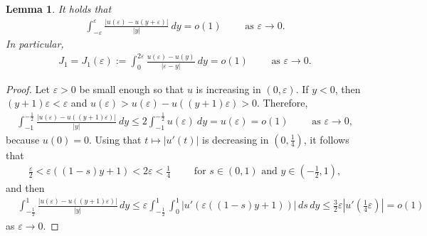 \documentclass[11pt]{article}
\newcommand{\eps}{{\varepsilon}}
\numberwithin{equation}{section}
\newtheorem{lemma}[theorem]{Lemma}
\begin{document}
\begin{lemma}\label{J1:s}
It holds that
\begin{align*}
    \int_{-\eps}^{\eps} \frac{|u(\eps)-u(y+\eps)|}{|y|}\ dy=o(1)\qquad \text{ as }\eps\to 0.
\end{align*}
In particular,
\begin{align*}
J_1=J_1(\eps):=\int_{0}^{2\eps} \frac{u(\eps)-u(y)}{|\eps-y|}\ dy=o(1)\qquad \text{ as }\eps\to 0.
\end{align*}
\end{lemma}
\begin{proof}
Let $\eps>0$ be small enough so that $u$ is increasing in $(0,\eps)$.  If $y<0$, then $(y+1)\eps<\eps$ and $u(\eps)>u(\eps)-u((y+1)\eps)>0$. Therefore,
\begin{align*}
\int_{-1}^{-\frac{1}{2}}
\frac{|u(\eps)-u((y+1)\eps)|}{|y|}
\ dy
\leq 
2\int_{-1}^{-\frac{1}{2}}
u(\eps)
\ dy
=u(\eps)
=o(1)\qquad \text{ as }\eps\to 0,
\end{align*}
because $u(0)=0$. Using that $t\mapsto |u'(t)|$ is decreasing in $(0,\frac{1}{4})$, it follows that 
\begin{align*}
\frac{\eps}{2}<\eps((1-s)y+1)<2\eps<\frac{1}{4}    \qquad \text{ for }s\in(0,1)\text{ and }y\in(-\tfrac{1}{2},1),
\end{align*}
and then
\begin{align*}
&\int_{-\frac{1}{2}}^1\frac{|u(\eps)-u((y+1)\eps)|}{|y|}\, dy
\leq\eps\int_{-\frac{1}{2}}^1 \int_0^1 |u'(\eps((1-s)y+1))| \,ds\, dy\leq \frac{3}{2}\eps |u'(\tfrac{1}{4}\eps)|
=o(1)
\end{align*}
as $\eps\to 0$.
\end{proof}
\end{document}
